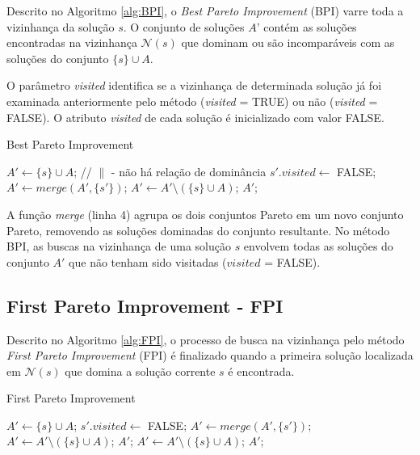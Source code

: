\documentclass[
	12pt,				%
	openany,			%
	oneside,	
	a4paper,			%
	brazil,				%
	]{unimontes-ppgmsc-abntex2}
\begin{document}
Descrito no Algoritmo \ref{alg:BPI}, o {\em Best Pareto Improvement} (BPI) varre toda a vizinhança da solução $s$. O conjunto de soluções $A’$ contém as soluções encontradas na vizinhança $\mathcal{N}(s)$ que dominam ou são incomparáveis com as soluções do conjunto $\{s\} \cup A$. 

O parâmetro {\em visited} identifica se a vizinhança de determinada solução já foi examinada anteriormente pelo método ({\em visited} = TRUE) ou não ({\em visited} = FALSE). O atributo {\em visited} de cada solução é inicializado com valor FALSE.

\begin{algorithm}[H]
\caption{Best Pareto Improvement}
\label{alg:BPI}
\begin{algorithmic}[1]
\State $A' \leftarrow \{s\} \cup A$;
   // $\parallel$ - \small{não há relação de dominância}
    \State $s'.visited \leftarrow$ FALSE;
    \State $A' \leftarrow merge(A', \{s'\})$;
  \EndIf
\EndFor
\State $A' \leftarrow A' \setminus (\{s\} \cup A)$;
\State \Return $A'$;
\end{algorithmic}
\end{algorithm}

A função {\em merge} (linha 4) agrupa os dois conjuntos Pareto em um novo conjunto Pareto, removendo as soluções dominadas do conjunto resultante. No método BPI, as buscas na vizinhança de uma solução $s$ envolvem todas as soluções do conjunto $A'$ que não tenham sido visitadas ($visited$ = FALSE).

\subsection{First Pareto Improvement - FPI} 

Descrito no Algoritmo \ref{alg:FPI}, o processo de busca na vizinhança pelo método {\em First Pareto Improvement} (FPI) é finalizado quando a primeira solução localizada em $\mathcal{N}(s)$ que domina a solução corrente $s$ é encontrada.

\begin{algorithm}[H]
\caption{First Pareto Improvement}
\label{alg:FPI}
\begin{algorithmic}[1]
\State $A' \leftarrow \{s\} \cup A$;
	\State $s'.visited\leftarrow$ FALSE;
    \State $A' \leftarrow merge(A', \{s'\})$;
      \State $A' \leftarrow A' \setminus (\{s\} \cup A)$;
      \State \Return $A'$;
    \EndIf
  \EndIf
\EndFor
\State $A' \leftarrow A' \setminus (\{s\} \cup A)$;
\State \Return $A'$;
\end{algorithmic}
\end{algorithm}
\end{document}
